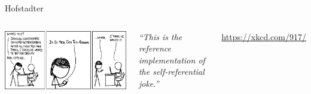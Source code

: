 
\begin{frame}[t,plain]
\titlepage
\end{frame}


\begin{frame}{Hofstadter}
%
\begin{columns}
\begin{center}
\includegraphics[width=\linewidth]{./gfx/06-xkcd-hofstadter}\\
\end{center}
%
\small
	\emph{\enquote{This is the reference implementation of the self-referential joke.}}

	\vspace{6pt}
	\url{https://xkcd.com/917/}
\end{columns}
%
\end{frame}


